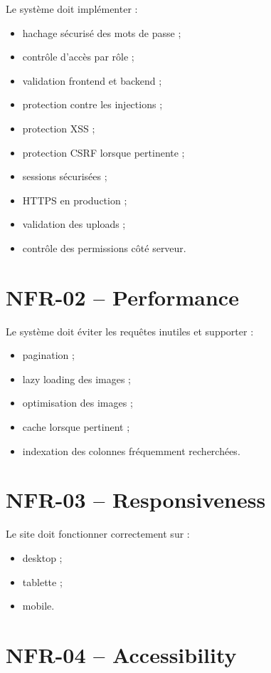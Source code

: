 \documentclass[11pt,a4paper]{report}
\begin{document}
Le système doit implémenter :

\begin{itemize}
    \item hachage sécurisé des mots de passe ;
    \item contrôle d'accès par rôle ;
    \item validation frontend et backend ;
    \item protection contre les injections ;
    \item protection XSS ;
    \item protection CSRF lorsque pertinente ;
    \item sessions sécurisées ;
    \item HTTPS en production ;
    \item validation des uploads ;
    \item contrôle des permissions côté serveur.
\end{itemize}

\section{NFR-02 -- Performance}

Le système doit éviter les requêtes inutiles et supporter :

\begin{itemize}
    \item pagination ;
    \item lazy loading des images ;
    \item optimisation des images ;
    \item cache lorsque pertinent ;
    \item indexation des colonnes fréquemment recherchées.
\end{itemize}

\section{NFR-03 -- Responsiveness}

Le site doit fonctionner correctement sur :

\begin{itemize}
    \item desktop ;
    \item tablette ;
    \item mobile.
\end{itemize}

\section{NFR-04 -- Accessibility}
\end{document}

